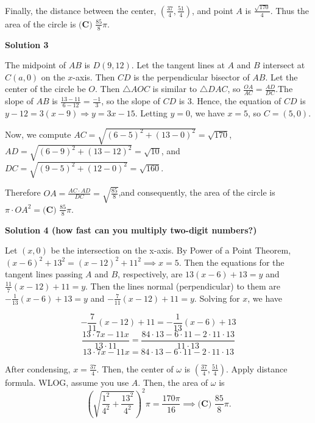 \begin{enumerate}
 Finally, the distance between the center, $\left(\frac{37}{4}, \frac{51}{4}\right)$, and point $A$ is $\frac{\sqrt{170}}{4}$. Thus the area of the circle is $\boxed{\textbf{(C) }\frac{85}{8}\pi}$.

 



\textbf{Solution 3}

The midpoint of $AB$ is $D(9,12)$. Let the tangent lines at $A$ and $B$ intersect at $C(a,0)$ on the $x$-axis. Then $CD$ is the perpendicular bisector of $AB$. Let the center of the circle be $O$. Then $\triangle AOC$ is similar to $\triangle DAC$, so $\frac{OA}{AC} = \frac{AD}{DC}$.The slope of $AB$ is $\frac{13-11}{6-12}=\frac{-1}{3}$, so the slope of $CD$ is $3$. Hence, the equation of $CD$ is $y-12=3(x-9) \Rightarrow y=3x-15$. Letting $y=0$, we have $x=5$, so $C = (5,0)$.

 Now, we compute $AC=\sqrt{(6-5)^2+(13-0)^2}=\sqrt{170}$,$AD=\sqrt{(6-9)^2+(13-12)^2}=\sqrt{10}$, and$DC=\sqrt{(9-5)^2+(12-0)^2}=\sqrt{160}$.

 Therefore $OA = \frac{AC\cdot AD}{DC}=\sqrt{\frac{85}{8}}$,and consequently, the area of the circle is $\pi\cdot OA^2 = \boxed{\textbf{(C) }\frac{85}{8}\pi}$.

 


 



\textbf{Solution 4 (how fast can you multiply two-digit numbers?)}

Let $(x,0)$ be the intersection on the x-axis. By Power of a Point Theorem, $(x-6)^2+13^2=(x-12)^2+11^2\implies x=5$. Then the equations  for the tangent lines passing $A$ and $B$, respectively, are $13(x-6)+13=y$ and $\frac{11}{7}(x-12)+11=y$. Then the lines normal (perpendicular) to them are $-\frac{1}{13}(x-6)+13=y$ and $-\frac{7}{11}(x-12)+11=y$. Solving for $x$, we have

 


 
 \[-\frac{7}{11}(x-12)+11=-\frac{1}{13}(x-6)+13\]
 \[\frac{13\cdot7x-11x}{13\cdot11}=\frac{84\cdot13-6\cdot11-2\cdot11\cdot13}{11\cdot13}\]
 \[13\cdot7x-11x=84\cdot13-6\cdot11-2\cdot11\cdot13\]

 After condensing, $x=\frac{37}{4}$. Then, the center of $\omega$ is $\left(\frac{37}{4}, \frac{51}{4}\right)$. Apply distance formula. WLOG, assume you use $A$. Then, the area of $\omega$ is 
 \[\left(\sqrt{\frac{1^2}{4^2}+\frac{13^2}{4^2}}\right)^2\pi=\frac{170\pi}{16} \implies \boxed{\textbf{(C) }\frac{85}{8}\pi}.\]





\end{enumerate}
